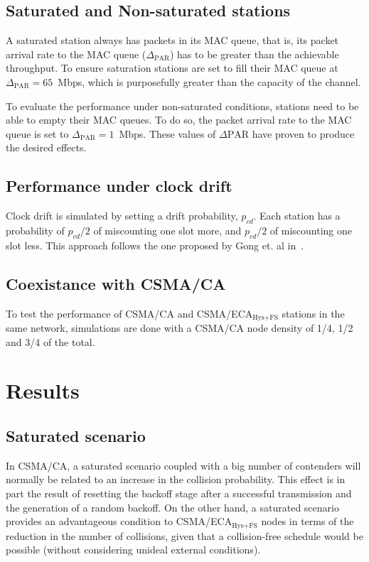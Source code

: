 \documentclass[a4paper,journal]{IEEEtran}
\begin{document}
	\subsection{Saturated and Non-saturated stations}\label{unsaturation}
	A saturated station always has packets in its MAC queue, that is, its packet arrival rate to the MAC queue ($\Delta_{\text{PAR}}$) has to be greater than the achievable throughput. To ensure saturation stations are set to fill their MAC queue at $\Delta_{\text{PAR}}=65$~Mbps, which is purposefully greater than the capacity of the channel.
	
	To evaluate the performance under non-saturated conditions, stations need to be able to empty their MAC queues. To do so, the packet arrival rate to the MAC queue is set to $\Delta_{\text{PAR}}=1$~Mbps. These values of $\Delta{\text{PAR}}$ have proven to produce the desired effects.
	
	\subsection{Performance under clock drift}
	Clock drift is simulated by setting a drift probability, $p_{cd}$. Each station has a probability of $p_{cd}/2$ of miscounting one slot more, and $p_{cd}/2$ of miscounting one slot less. This approach follows the one proposed by Gong et. al in~\cite{slotDrift}.
	
	\subsection{Coexistance with CSMA/CA}
	To test the performance of CSMA/CA and CSMA/ECA$_{\text{Hys+FS}}$ stations in the same network, simulations are done with a CSMA/CA node density of 1/4, 1/2 and 3/4 of the total.
	

\section{Results}\label{results}

	\subsection{Saturated scenario}\label{resultsSaturated}
	In CSMA/CA, a saturated scenario coupled with a big number of contenders will normally be related to an increase in the collision probability. This effect is in part the result of resetting the backoff stage after a successful transmission and the generation of a random backoff. On the other hand, a saturated scenario provides an advantageous condition to CSMA/ECA$_{\text{Hys+FS}}$ nodes in terms of the reduction in the number of collisions, given that a collision-free schedule would be possible (without considering unideal external conditions).
	
\end{document}
